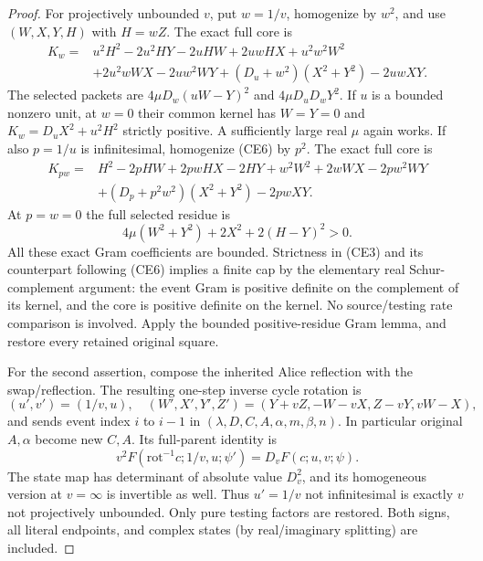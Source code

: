\begin{proof}
For projectively unbounded $v$, put $w=1/v$, homogenize by $w^2$, and
use $(W,X,Y,H)$ with $H=wZ$. The exact full core is
\begin{align*}
 K_w={}&u^2H^2-2u^2HY-2uHW+2uwHX+u^2w^2W^2\\
 &+2u^2wWX-2uw^2WY+(D_u+w^2)(X^2+Y^2)-2uwXY.
                                                        \tag{CE6}
\end{align*}
The selected packets are $4\mu D_w(uW-Y)^2$ and
$4\mu D_uD_wY^2$. If $u$ is a bounded nonzero unit, at $w=0$ their
common kernel has $W=Y=0$ and $K_w=D_uX^2+u^2H^2$ strictly positive.
A sufficiently large real $\mu$ again works. If also $p=1/u$ is
infinitesimal, homogenize (CE6) by $p^2$. The exact full core is
\begin{align*}
 K_{pw}={}&H^2-2pHW+2pwHX-2HY+w^2W^2+2wWX-2pw^2WY\\
 &+(D_p+p^2w^2)(X^2+Y^2)-2pwXY.              \tag{CE7}
\end{align*}
At $p=w=0$ the full selected residue is
\[
 4\mu(W^2+Y^2)+2X^2+2(H-Y)^2>0.             \tag{CE8}
\]
All these exact Gram coefficients are bounded. Strictness in (CE3) and
its counterpart following (CE6) implies a finite cap by the elementary
real Schur-complement argument: the event Gram is positive definite on
the complement of its kernel, and the core is positive definite on the
kernel. No source/testing rate comparison is involved. Apply the bounded
positive-residue Gram lemma, and restore every retained original square.

For the second assertion, compose the inherited Alice reflection with
the swap/reflection. The resulting one-step inverse cycle rotation is
\[
 (u',v')=(1/v,u),\quad
 (W',X',Y',Z')=(Y+vZ,-W-vX,Z-vY,vW-X),          \tag{CE9}
\]
and sends event index $i$ to $i-1$ in
$(\lambda,D,C,A,\alpha,m,\beta,n)$. In particular original $A,\alpha$
become new $C,A$. Its full-parent identity is
\[
 v^2F(\mathrm{rot}^{-1}c;1/v,u;\psi')=D_vF(c;u,v;\psi).
                                                        \tag{CE10}
\]
The state map has determinant of absolute value $D_v^2$, and its
homogeneous version at $v=\infty$ is invertible as well. Thus
$u'=1/v$ not infinitesimal is exactly $v$ not projectively unbounded.
Only pure testing factors are restored. Both signs, all literal endpoints,
and complex states (by real/imaginary splitting) are included.
\end{proof}

